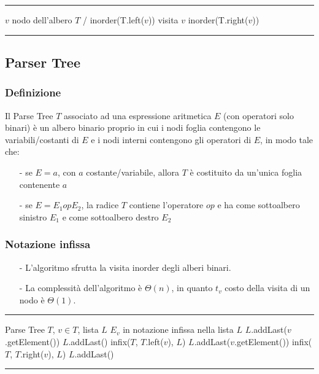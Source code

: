 \documentclass[a4paper]{article}
\makeatletter
\newenvironment{algo}[4]{
	\noindent\rule{\textwidth}{0.4pt}
	\begin{algorithmic}[1]
		\addtocounter{ALG@line}{-1}
		\Procedure{#1}{#2}
		\Require #3
		\Ensure #4
		\Statex }{
		\EndProcedure
	\end{algorithmic}
	\rule{\textwidth}{0.4pt}}
\makeatother
\begin{document}
\begin{algo}{inorder}{$v$}{$v$ nodo dell'albero $T$}{/}
		\State inorder(T.left(\(v\)))
	\EndIf
	\State visita $v$
		\State inorder(T.right(\(v\)))
	\EndIf
\end{algo}

\subsection{Parser Tree}
\subsubsection*{Definizione}
Il Parse Tree \(T\) associato ad una espressione aritmetica \(E\) (con operatori solo binari) è un albero binario proprio in cui
i nodi foglia contengono le variabili/costanti di \(E\) e i nodi interni contengono gli operatori di \(E\), in modo tale che:
\begin{itemize}[topsep=3pt, itemsep=0pt]
	\item[-] se \(E = a\), con \(a\) costante/variabile, allora \(T\) è costituito da un'unica foglia contenente \(a\)
	\item[-] se \(E = E_1 op E_2\), la radice \(T\) contiene l'operatore \(op\) e ha come sottoalbero sinistro \(E_1\) e come
	sottoalbero destro \(E_2\)
\end{itemize}

\subsubsection*{Notazione infissa}
\begin{itemize}[topsep=3pt, itemsep=0pt]
	\item[-] L'algoritmo sfrutta la visita inorder degli alberi binari.
	\item[-] La complessità dell'algoritmo è \(\Theta\left(n\right)\), in quanto \(t_v\) costo della visita di un nodo è \(\Theta(1)\).
\end{itemize}
\begin{algo}{infix}{$T$, $v$, $L$}{Parse Tree $T$, \(v \in T\), lista $L$}{$E_v$ in notazione infissa nella lista $L$}
		\State $L$.addLast($v$.getElement())
	\Else
		\State $L$.addLast(\say{(})
		\State infix($T$, $T$.left($v$), $L$)
		\State $L$.addLast($v$.getElement())
		\State infix($T$, $T$.right($v$), $L$)
		\State $L$.addLast(\say{)})
	\EndIf
\end{algo}
\end{document}
